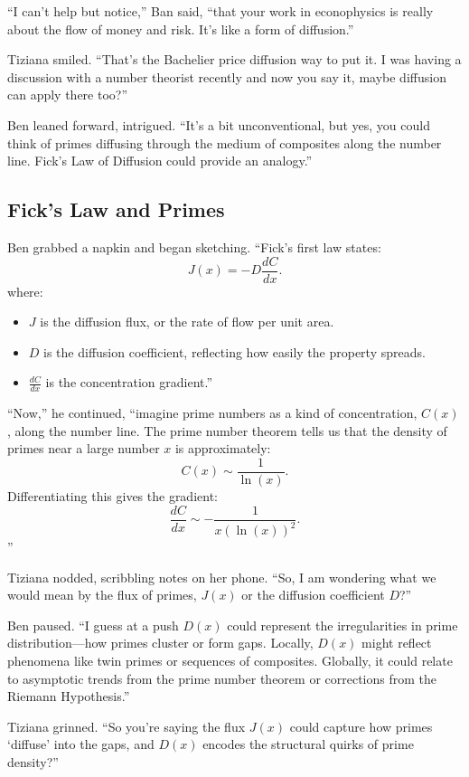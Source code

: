 “I can’t help but notice,” Ban said, “that your work in econophysics is really about the flow of money and risk. It’s like a form of diffusion.”

Tiziana smiled. “That’s the Bachelier price diffusion way to put it. I was having a discussion with a number theorist recently  and now you say it, maybe diffusion can apply there too?”

Ben leaned forward, intrigued. “It’s a bit unconventional, but yes, you could think of primes diffusing through the medium of composites along the number line. Fick’s Law of Diffusion could provide an analogy.”

\subsection*{Fick’s Law and Primes}

Ben grabbed a napkin and began sketching. “Fick’s first law states:
\[
J(x) = -D \frac{dC}{dx}.
\]
where:
\begin{itemize}
    \item \(J\) is the diffusion flux, or the rate of flow per unit area.
    \item \(D\) is the diffusion coefficient, reflecting how easily the property spreads.
    \item \(\frac{dC}{dx}\) is the concentration gradient.”
\end{itemize}

“Now,” he continued, “imagine prime numbers as a kind of concentration, \(C(x)\), along the number line. The prime number theorem tells us that the density of primes near a large number \(x\) is approximately:
\[
C(x) \sim \frac{1}{\ln(x)}.
\]
Differentiating this gives the gradient:
\[
\frac{dC}{dx} \sim -\frac{1}{x (\ln(x))^2}.
\]”

Tiziana nodded, scribbling notes on her phone. “So, I am wondering what we would mean by the flux of primes, \(J(x)\) or the diffusion coefficient \(D\)?”

Ben paused. “I guess at a push \(D(x)\) could represent the irregularities in prime distribution—how primes cluster or form gaps. Locally, \(D(x)\) might reflect phenomena like twin primes or sequences of composites. Globally, it could relate to asymptotic trends from the prime number theorem or corrections from the Riemann Hypothesis.”

Tiziana grinned. “So you’re saying the flux \(J(x)\) could capture how primes ‘diffuse’ into the gaps, and \(D(x)\) encodes the structural quirks of prime density?”

